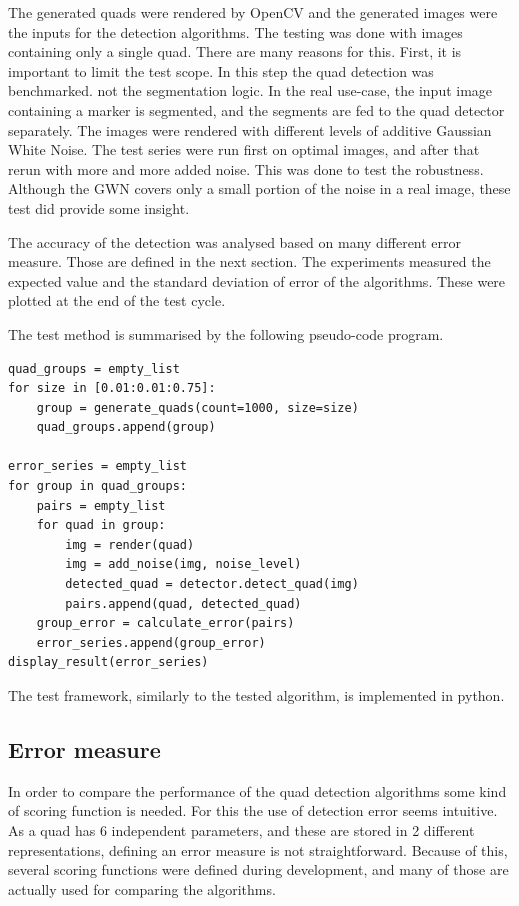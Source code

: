 The generated quads were rendered by OpenCV and the generated images were the inputs for the detection algorithms.
The testing was done with images containing only a single quad.
There are many reasons for this.
First, it is important to limit the test scope.
In this step the quad detection was benchmarked. not the segmentation logic.
In the real use-case, the input image containing a marker is segmented, and the segments are fed to the quad detector separately.
The images were rendered with different levels of additive Gaussian White Noise.
The test series were run first on optimal images, and after that rerun with more and more added noise.
This was done to test the robustness.
Although the GWN covers only a small portion of the noise in a real image, these test did provide some insight.

The accuracy of the detection was analysed based on many different error measure.
Those are defined in the next section.
The experiments measured the expected value and the standard deviation of error of the algorithms.
These were plotted at the end of the test cycle.

The test method is summarised by the following pseudo-code program.
\begin{lstlisting}
quad_groups = empty_list
for size in [0.01:0.01:0.75]:
	group = generate_quads(count=1000, size=size)
	quad_groups.append(group)

error_series = empty_list
for group in quad_groups:
	pairs = empty_list
	for quad in group:
		img = render(quad)
		img = add_noise(img, noise_level)
		detected_quad = detector.detect_quad(img)
		pairs.append(quad, detected_quad)
	group_error = calculate_error(pairs)
	error_series.append(group_error)
display_result(error_series)	
\end{lstlisting}

The test framework, similarly to the tested algorithm, is implemented in python.

\subsection{Error measure}

In order to compare the performance of the quad detection algorithms some kind of scoring function is needed.
For this the use of detection error seems intuitive.
As a quad has 6 independent parameters, and these are stored in 2 different representations, defining an error measure is not straightforward.
Because of this, several scoring functions were defined during development, and many of those are actually used for comparing the algorithms.

